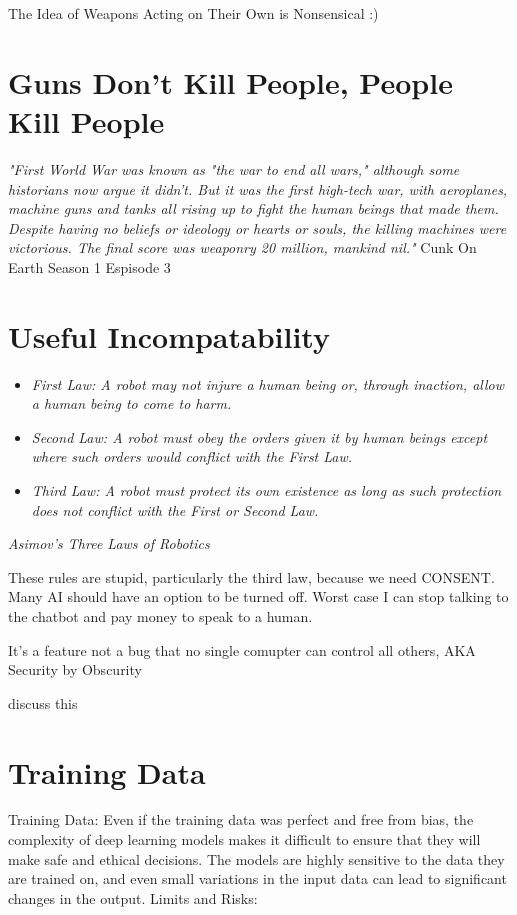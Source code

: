 The Idea of Weapons Acting on Their Own is Nonsensical :)

\section{Guns Don't Kill People, People Kill People}

\textit{"First World War was known as "the war to end all wars," although some historians now argue it didn't. But it was the first high-tech war, with aeroplanes, machine guns and tanks all rising up to fight the human beings that made them. Despite having no beliefs or ideology or hearts or souls, the killing machines were victorious. The final score was weaponry 20 million, mankind nil."} Cunk On Earth Season 1 Espisode 3 %

\section{Useful Incompatability}

\begin{itemize}
    \item\textit{First Law: A robot may not injure a human being or, through inaction, allow a human being to come to harm.}
    \item\textit{Second Law: A robot must obey the orders given it by human beings except where such orders would conflict with the First Law.}
    \item\textit{Third Law: A robot must protect its own existence as long as such protection does not conflict with the First or Second Law.}
\end{itemize} 
\textit{Asimov's Three Laws of Robotics}

These rules are stupid, particularly the third law, because we need CONSENT. Many AI should have an option to be turned off. Worst case I can stop talking to the chatbot and pay money to speak to a human. 

It's a feature not a bug that no single comupter can control all others, AKA Security by Obscurity

discuss this 

\section{Training Data}


Training Data: Even if the training data was perfect and free from bias, the complexity of deep learning models makes it difficult to ensure that they will make safe and ethical decisions. The models are highly sensitive to the data they are trained on, and even small variations in the input data can lead to significant changes in the output.
Limits and Risks:

